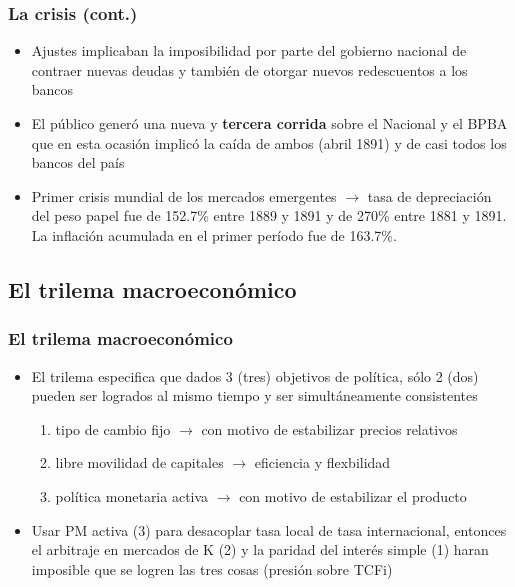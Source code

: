 \documentclass[14pt,aspectratio=169]{beamer}
\begin{document}
  
        \begin{frame}\frametitle{La crisis (cont.)}
     \begin{itemize}
     \item Ajustes implicaban la imposibilidad por parte del
       gobierno nacional de contraer nuevas deudas y también de
       otorgar nuevos redescuentos a los bancos
       \item El público generó una
         nueva y \textbf{tercera corrida} sobre el Nacional y el
         BPBA que en esta ocasión implicó la caída de ambos (abril 1891) y de casi
         todos los bancos del país
         \item Primer crisis mundial de los mercados emergentes
           $\longrightarrow$ tasa de depreciación del peso papel fue
           de 152.7\% entre 1889 y 1891 y de 270\% entre 1881 y
           1891. La inflación acumulada en el primer período fue de
           163.7\%. 
     \end{itemize}
        \end{frame}



          \subsection{El trilema macroeconómico}

        


        \begin{frame}\frametitle{El trilema macroeconómico}
     \begin{itemize}
     \item El trilema especifica que dados 3 (tres) objetivos de
       política, sólo 2 (dos) pueden ser logrados al mismo
       tiempo y ser simultáneamente consistentes
       \begin{enumerate}\itemsep 10pt \bigskip
                \item tipo de cambio fijo $\longrightarrow$ con motivo
                  de estabilizar precios relativos
                  \item libre movilidad de capitales $\longrightarrow$
                    eficiencia y flexbilidad
                    \item política monetaria activa                      $\longrightarrow$ con motivo de estabilizar el
                      producto
                    \end{enumerate}
                    \item Usar PM activa (3) para desacoplar tasa local de
                      tasa internacional, entonces el arbitraje en
                      mercados de K (2) y la paridad del interés
                      simple (1) haran imposible que se logren las
                      tres cosas (presión sobre TCFi) 
     \end{itemize}
        \end{frame}
\end{document}
